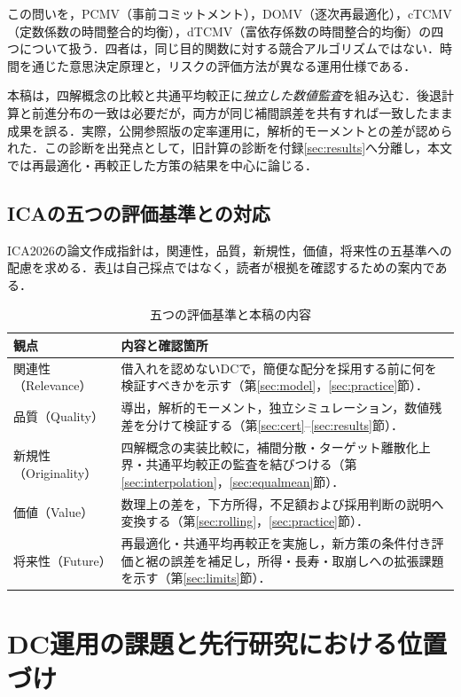 \documentclass[11pt,a4paper]{article}
\numberwithin{equation}{section}
\numberwithin{table}{section}
\numberwithin{figure}{section}
\theoremstyle{plain}
\theoremstyle{definition}
\begin{document}
この問いを，PCMV（事前コミットメント），DOMV（逐次再最適化），cTCMV（定数係数の時間整合的均衡），dTCMV（富依存係数の時間整合的均衡）の四つについて扱う．四者は，同じ目的関数に対する競合アルゴリズムではない．時間を通じた意思決定原理と，リスクの評価方法が異なる運用仕様である．

本稿は，四解概念の比較と共通平均較正に\emph{独立した数値監査}を組み込む．後退計算と前進分布の一致は必要だが，両方が同じ補間誤差を共有すれば一致したまま成果を誤る．実際，公開参照版の定率運用に，解析的モーメントとの差が認められた．この診断を出発点として，旧計算の診断を付録\ref{sec:results}へ分離し，本文では再最適化・再較正した方策の結果を中心に論じる．

\subsection{ICAの五つの評価基準との対応}
ICA2026の論文作成指針は，関連性，品質，新規性，価値，将来性の五基準への配慮を求める\citep{ICA2026Guidance,ICA2026Call}．表\ref{tab:ica}は自己採点ではなく，読者が根拠を確認するための案内である．
\begin{table}[htbp]\centering\small
\caption{五つの評価基準と本稿の内容}\label{tab:ica}
\begin{tabularx}{\textwidth}{>{\raggedright\arraybackslash}p{31mm}X}
\toprule 観点 & 内容と確認箇所 \\ \midrule
関連性（Relevance） & 借入れを認めないDCで，簡便な配分を採用する前に何を検証すべきかを示す（第\ref{sec:model}，\ref{sec:practice}節）．\\
品質（Quality） & 導出，解析的モーメント，独立シミュレーション，数値残差を分けて検証する（第\ref{sec:cert}--\ref{sec:results}節）．\\
新規性（Originality） & 四解概念の実装比較に，補間分散・ターゲット離散化上界・共通平均較正の監査を結びつける（第\ref{sec:interpolation}，\ref{sec:equalmean}節）．\\
価値（Value） & 数理上の差を，下方所得，不足額および採用判断の説明へ変換する（第\ref{sec:rolling}，\ref{sec:practice}節）．\\
将来性（Future） & 再最適化・共通平均再較正を実施し，新方策の条件付き評価と裾の誤差を補足し，所得・長寿・取崩しへの拡張課題を示す（第\ref{sec:limits}節）．\\
\bottomrule\end{tabularx}\end{table}

\FloatBarrier
\section{DC運用の課題と先行研究における位置づけ}
\label{sec:background}
\end{document}
